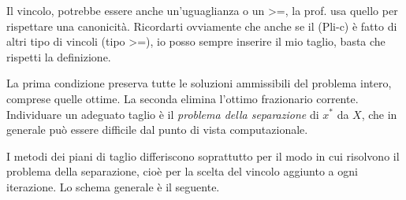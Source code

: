 \begin{observation}{}
  Il vincolo, potrebbe essere anche un'uguaglianza o un >=, la prof. usa quello per rispettare una canonicità.
  Ricordarti ovviamente che anche se il (Pli-c) è fatto di altri tipo di vincoli (tipo >=), io posso sempre inserire il mio taglio, basta che rispetti la definizione.
\end{observation}


La prima condizione preserva tutte le soluzioni ammissibili
del problema intero, comprese quelle ottime.
La seconda elimina l'ottimo frazionario corrente.
Individuare un adeguato taglio è il \emph{problema della separazione}
di \(x^*\) da \(X\), che in generale può essere difficile
dal punto di vista computazionale.

\begin{center}
\begin{minipage}{\linewidth}
\centering
\captionsetup{hypcap=false}
\label{fig:taglio-generico}
\end{minipage}
\end{center}

I metodi dei piani di taglio differiscono soprattutto per
il modo in cui risolvono il problema della separazione,
cioè per la scelta del vincolo aggiunto a ogni iterazione.
Lo schema generale è il seguente.

